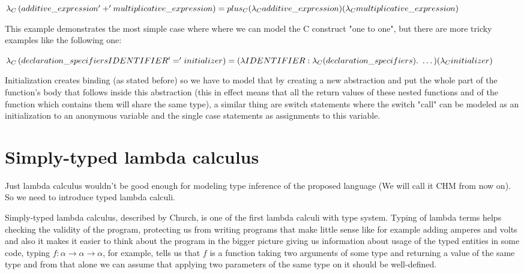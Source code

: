 $
    \lambda_C\left(additive\_expression '+' multiplicative\_expression\right) = \\
    plus_C (\lambda_C additive\_expression) (\lambda_C multiplicative\_expression)
$

This example demonstrates the most simple case where  where we can model the C construct "one to one",
but there are more tricky examples like the following one:

$
    \lambda_C\left(declaration\_specifiers IDENTIFIER '=' initializer\right) = \\
    (\lambda IDENTIFIER : \lambda_C(declaration\_specifiers) .\ \dots) (\lambda_C initializer)
$

Initialization creates binding (as stated before) so we have to model that by creating a new abstraction and put the whole
part of the function's body that follows inside this abstraction (this in effect means that all the return values of these nested functions
and of the function which contains them will share the same type), a similar thing are switch statements where the switch "call" can be modeled
as an initialization to an anonymous variable and the single case statements as assignments to this variable.

\section{Simply-typed lambda calculus}

Just lambda calculus wouldn't be good enough for modeling type inference of the proposed language (We will call it CHM from now on).
So we need to introduce typed lambda calculi.

Simply-typed lambda calculus, described by Church, is one of the first %
lambda calculi with type system. Typing of lambda terms helps checking the validity of the program, protecting us from writing
programs that make little sense like for example adding amperes and volts %
and also it makes it easier to think about the program in the bigger picture giving us information about usage of the typed entities
in some code, typing $f : \alpha \rightarrow \alpha \rightarrow \alpha$, for example, tells us that $f$ is a function taking two arguments
of some type and returning a value of the same type and from that alone we can assume that applying two parameters of the same type on it
should be well-defined.

